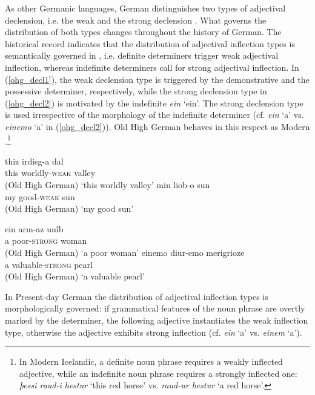 \documentclass[output=paper
                ,modfonts
                ,nonflat
	        ,collection
	        ,collectionchapter
	        ,collectiontoclongg
 	        ,biblatex
                ,babelshorthands
                ,newtxmath
                ,draftmode
                ,colorlinks, citecolor=brown
]{./langsci/langscibook}
\begin{document}
As other Germanic languages, German distinguishes two types of adjectival declension, i.e. the weak and the strong declension \citep{VeSlPe2014}. What governs the distribution of both types changes throughout the history of German. The historical record indicates that the distribution of adjectival inflection types is semantically governed in , i.e. definite determiners trigger weak adjectival inflection, whereas indefinite determiners call for strong adjectival inflection. In (\ref{ohg_decl1}), the weak declension type is triggered by the demonstrative and the possessive determiner, respectively, while the strong declension type in (\ref{ohg_decl2}) is motivated by the indefinite \textit{ein} `ein'. The strong declension type is used irrespective of the morphology of the indefinite determiner (cf. \textit{ein} `a' vs. \textit{einemo} `a' in (\ref{ohg_decl2})). Old High German behaves in this respect as Modern .\footnote{In Modern Icelandic, a definite noun phrase requires a weakly inflected adjective, while an indefinite noun phrase requires a strongly inflected one: \textit{þessi raud-i hestur} `this red horse' vs. \textit{raud-ur hestur} `a red horse'.} 

      
\eal \label{ohg_decl1}
\ex
\gll thiz irdisg-a dal \\  this worldly-\textsc{weak}{} valley \\ \hfill (Old High German)
\glt `this worldly valley'
\ex
\gll min liob-o sun \\ my good-\textsc{weak} sun \\  \hfill (Old High German)
\glt `my good sun'
\zl

\eal \label{ohg_decl2}
\ex 
\gll ein arm-az uuîb \\ a poor-\textsc{strong} woman \\ \hfill (Old High German)
\glt `a poor woman'
\ex 
\gll einemo diur-emo merigrioze \\ a valuable-\textsc{strong} pearl \\ \hfill (Old High German)
\glt `a valuable pearl'

\zl
In Present-day German the distribution of adjectival inflection types is morphologically governed: if grammatical features of the noun phrase are overtly marked by the determiner, the following adjective instantiates the weak inflection type, otherwise the adjective exhibits strong inflection (cf. \textit{ein} `a' vs. \textit{einem} `a').
       
\end{document}
